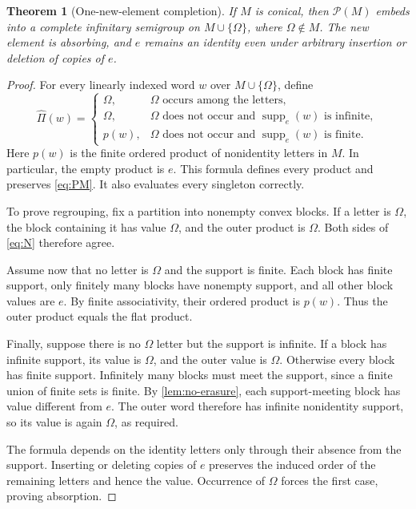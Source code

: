 \documentclass[11pt,letterpaper]{article}
\numberwithin{equation}{section}
\newtheorem{theorem}{Theorem}[section]
\theoremstyle{definition}
\theoremstyle{remark}
\newcommand{\PP}{\mathcal{P}}
\newcommand{\supp}{\operatorname{supp}}
\newcommand{\set}[1]{\{#1\}}
\begin{document}
\begin{theorem}[One-new-element completion]\label{thm:completion}
If $M$ is conical, then $\PP(M)$ embeds into a complete infinitary semigroup on $M\cup\set{\Omega}$, where $\Omega\notin M$. The new element is absorbing, and $e$ remains an identity even under arbitrary insertion or deletion of copies of $e$.
\end{theorem}
\begin{proof}
For every linearly indexed word $w$ over $M\cup\set{\Omega}$, define
\begin{equation}\label{eq:Omega-completion}
\widehat\Pi(w)=
\begin{cases}
\Omega, & \Omega\text{ occurs among the letters},\\
\Omega, & \Omega\text{ does not occur and }\supp_e(w)\text{ is infinite},\\
p(w), & \Omega\text{ does not occur and }\supp_e(w)\text{ is finite}.
\end{cases}
\end{equation}
Here $p(w)$ is the finite ordered product of nonidentity letters in $M$. In particular, the empty product is $e$. This formula defines every product and preserves \eqref{eq:PM}. It also evaluates every singleton correctly.

To prove regrouping, fix a partition into nonempty convex blocks. If a letter is $\Omega$, the block containing it has value $\Omega$, and the outer product is $\Omega$. Both sides of \eqref{eq:N} therefore agree.

Assume now that no letter is $\Omega$ and the support is finite. Each block has finite support, only finitely many blocks have nonempty support, and all other block values are $e$. By finite associativity, their ordered product is $p(w)$. Thus the outer product equals the flat product.

Finally, suppose there is no $\Omega$ letter but the support is infinite. If a block has infinite support, its value is $\Omega$, and the outer value is $\Omega$. Otherwise every block has finite support. Infinitely many blocks must meet the support, since a finite union of finite sets is finite. By \cref{lem:no-erasure}, each support-meeting block has value different from $e$. The outer word therefore has infinite nonidentity support, so its value is again $\Omega$, as required.

The formula depends on the identity letters only through their absence from the support. Inserting or deleting copies of $e$ preserves the induced order of the remaining letters and hence the value. Occurrence of $\Omega$ forces the first case, proving absorption.
\end{proof}
\end{document}
